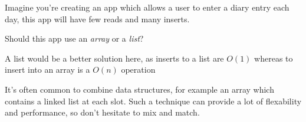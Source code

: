 \documentclass[]{article}
\begin{document}
    \begin{question}
        Imagine you're creating an app which allows a user to enter a diary entry each day, this app will have few reads and many inserts.

        Should this app use an \emph{array} or a \emph{list}?
    \end{question}
    \begin{answer}
        A list would be a better solution here, as inserts to a list are $O(1)$ whereas to insert into an array is a $O(n)$ operation
    \end{answer}
    
    It's often common to combine data structures, for example an array which contains a linked list at each slot. Such a technique can provide a lot of flexability and performance, so don't hesitate to mix and match.

        
\end{document}
